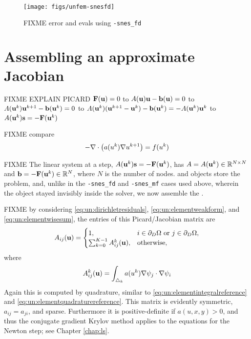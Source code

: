 \begin{figure}
\texttt{[image: figs/unfem-snesfd]}
\caption{FIXME error and evals using \texttt{-snes\_fd}}
\label{fig:un:unfem-snesfd}
\end{figure}


\section{Assembling an approximate Jacobian}

FIXME EXPLAIN PICARD $\mathbf{F}(\mathbf{u})=0$ to $A(\mathbf{u}) \mathbf{u} - \mathbf{b}(\mathbf{u})=0$ to $A(\mathbf{u}^k) \mathbf{u}^{k+1} - \mathbf{b}(\mathbf{u}^k)=0$ to $A(\mathbf{u}^k) (\mathbf{u}^{k+1}-\mathbf{u}^k) - \mathbf{b}(\mathbf{u}^k)= - A(\mathbf{u}^k) \mathbf{u}^k$ to $A(\mathbf{u}^k) \mathbf{s} = -\mathbf{F}(\mathbf{u}^k)$

FIXME compare
    $$-\nabla\cdot\left(a(u^k) \nabla u^{k+1}\right) = f(u^k)$$

FIXME The linear system at a step, $A(\mathbf{u}^k) \mathbf{s} = -\mathbf{F}(\mathbf{u}^k)$, has $A=A(\mathbf{u}^k)\in\mathbb{R}^{N\times N}$ and $\mathbf{b}=-\mathbf{F}(\mathbf{u}^k)\in\mathbb{R}^N$, where $N$ is the number of nodes.  \pMat and \pVec objects store the problem, and, unlike in the \texttt{-snes\_fd} and \texttt{-snes\_mf} cases used above, wherein the \pMat object stayed invisibly inside the \pSNES solver, we now assemble the \pMat.

FIXME by considering \eqref{eq:un:dirichletresiduals}, \eqref{eq:un:elementweakform}, and \eqref{eq:un:elementwisesum}, the entries of this Picard/Jacobian matrix are
\begin{equation}
A_{ij}(\mathbf{u}) =  \begin{cases}
               1, & i \in \partial_D\Omega \text{ or } j \in \partial_D\Omega, \\
               \sum_{k=0}^{K-1} A_{ij}^k(\mathbf{u}), & \text{otherwise},
               \end{cases} \label{eq:un:picardentry}
\end{equation}
where
\begin{equation}
A_{ij}^k(\mathbf{u}) = \int_{\triangle_k} a(u^h) \nabla\psi_j \cdot \nabla\psi_i \label{eq:un:picardentryelement}
\end{equation}
Again this is computed by quadrature, similar to \eqref{eq:un:elementintegralreference} and \eqref{eq:un:elementquadraturereference}.  This matrix is evidently symmetric, $a_{ij}=a_{ji}$, and sparse.  Furthermore it is positive-definite if $a(u,x,y)>0$, and thus the conjugate gradient Krylov method applies to the equations for the Newton step; see Chapter \ref{chap:ls}.


